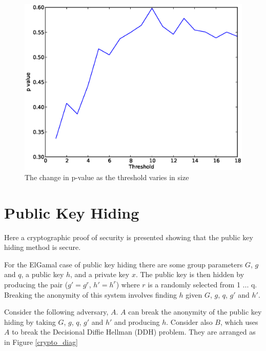\documentclass[ %
                    author={Luke Murray},
                supervisor={Dr. Simon Hollis},
                     title={Shadow Peer-to-Peer Networks},
                  subtitle={},
                    degree={MEng},
                      year={2013} ]{thesis}
\begin{document}
\begin{figure}[h]
    \centering
    \begin{minipage}[b]{0.8\linewidth}
        \centering
        \includegraphics[width=\linewidth]{diagrams/variable_t2.eps}
        \caption{The change in p-value as the threshold varies in size}
    \end{minipage}
    \label{variable_t}
\end{figure}

\section{Public Key Hiding}

Here a cryptographic proof of security is presented showing that the public key hiding method is secure.

For the ElGamal case of public key hiding there are some group parameters $G$, $g$ and $q$, a public key $h$, and a private key $x$. The public key is then hidden by producing the pair ($g\prime = g^{r}$, $h\prime = h^{r}$) where $r$ is a randomly selected from {1 ... q}. Breaking the anonymity of this system involves finding $h$ given $G$, $g$, $q$, $g\prime$ and $h\prime$.

Consider the following adversary, $A$. $A$ can break the anonymity of the public key hiding by taking $G$, $g$, $q$, $g\prime$ and $h\prime$ and producing $h$. Consider also $B$, which uses $A$ to break the Decisional Diffie Hellman (DDH) problem. They are arranged as in Figure \ref{crypto_diag}
\end{document}
